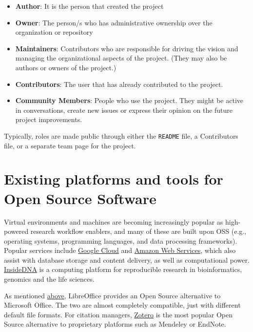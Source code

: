 \documentclass[]{book}
\providecommand{\tightlist}{%
  \setlength{\itemsep}{0pt}\setlength{\parskip}{0pt}}
\begin{document}
{{{{{{{{{{{\begin{itemize}
\tightlist
\item
  \textbf{Author}: It is the person that created the project
\item
  \textbf{Owner}: The person/s who has administrative ownership over the organization or repository
\item
  \textbf{Maintainers}: Contributors who are responsible for driving the vision and managing the organizational aspects of the project. (They may also be authors or owners of the project.)
\item
  \textbf{Contributors}: The user that has already contributed to the project.
\item
  \textbf{Community Members}: People who use the project. They might be active in conversations, create new issues or express their opinion on the future project improvements.
\end{itemize}

Typically, roles are made public through either the \texttt{README} file, a Contributors file, or a separate team page for the project.

\hypertarget{existing-platforms-and-tools-for-open-source-software}{%
\section{Existing platforms and tools for Open Source Software }\label{existing-platforms-and-tools-for-open-source-software}}

Virtual environments and machines are becoming increasingly popular as high-powered research workflow enablers, and many of these are built upon OSS (e.g., operating systems, programming languages, and data processing frameworks). Popular services include \href{https://cloud.google.com/compute/}{Google Cloud} and \href{https://aws.amazon.com/}{Amazon Web Services}, which also assist with database storage and content delivery, as well as computational power. \href{https://insidedna.me/}{InsideDNA} is a computing platform for reproducible research in bioinformatics, genomics and the life sciences.

As mentioned \protect\hyperlink{What_OSS}{above}, LibreOffice provides an Open Source alternative to Microsoft Office. The two are almost completely compatible, just with different default file formats. For citation managers, \href{https://www.zotero.org/}{Zotero} is the most popular Open Source alternative to proprietary platforms such as Mendeley or EndNote.

}}}}}}}}}}}
\end{document}

